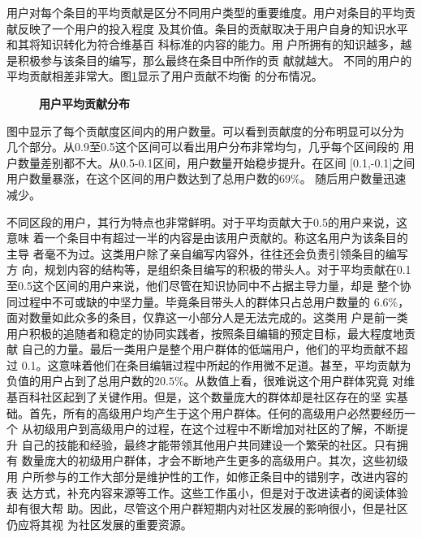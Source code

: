 用户对每个条目的平均贡献是区分不同用户类型的重要维度。用户对条目的平均贡献反映了一个用户的投入程度
及其价值。条目的贡献取决于用户自身的知识水平和其将知识转化为符合维基百
科标准的内容的能力。用
户所拥有的知识越多，越是积极参与该条目的编写，那么最终在条目中所作的贡
献就越大。
不同的用户的平均贡献相差非常大。图\ref{fig:con-detri}显示了用户贡献不均衡
的分布情况。
\begin{figure}[!htb]
  \label{fig:con-detri}
  \centering
  \caption{\small{\textbf{用户平均贡献分布}}}
\end{figure}

图中显示了每个贡献度区间内的用户数量。可以看到贡献度的分布明显可以分为
几个部分。从0.9至0.5这个区间可以看出用户分布非常均匀，几乎每个区间段的
用户数量差别都不大。从0.5-0.1区间，用户数量开始稳步提升。在区间
[0.1,-0.1]之间用户数量暴涨，在这个区间的用户数达到了总用户数的$69\%$。
随后用户数量迅速减少。

不同区段的用户，其行为特点也非常鲜明。对于平均贡献大于0.5的用户来说，这意味
着一个条目中有超过一半的内容是由该用户贡献的。称这名用户为该条目的主导
者毫不为过。这类用户除了亲自编写内容外，往往还会负责引领条目的编写方
向，规划内容的结构等，是组织条目编写的积极的带头人。对于平均贡献在0.1
至0.5这个区间的用户来说，他们尽管在知识协同中不占据主导力量，却是
整个协同过程中不可或缺的中坚力量。毕竟条目带头人的群体只占总用户数量的
$6.6\%$，面对数量如此众多的条目，仅靠这一小部分人是无法完成的。这类用
户是前一类用户积极的追随者和稳定的协同实践者，按照条目编辑的预定目标，最大程度地贡献
自己的力量。最后一类用户是整个用户群体的低端用户，他们的平均贡献不超过
0.1。这意味着他们在条目编辑过程中所起的作用微不足道。甚至，平均贡献为
负值的用户占到了总用户数的$20.5\%$。从数值上看，很难说这个用户群体究竟
对维基百科社区起到了关键作用。但是，这个数量庞大的群体却是社区存在的坚
实基础。首先，所有的高级用户均产生于这个用户群体。任何的高级用户必然要经历一个
从初级用户到高级用户的过程，在这个过程中不断增加对社区的了解，不断提升
自己的技能和经验，最终才能带领其他用户共同建设一个繁荣的社区。只有拥有
数量庞大的初级用户群体，才会不断地产生更多的高级用户。其次，这些初级用
户所参与的工作大部分是维护性的工作，如修正条目中的错别字，改进内容的表
达方式，补充内容来源等工作。这些工作虽小，但是对于改进读者的阅读体验却有很大帮
助。因此，尽管这个用户群短期内对社区发展的影响很小，但是社区仍应将其视
为社区发展的重要资源。


